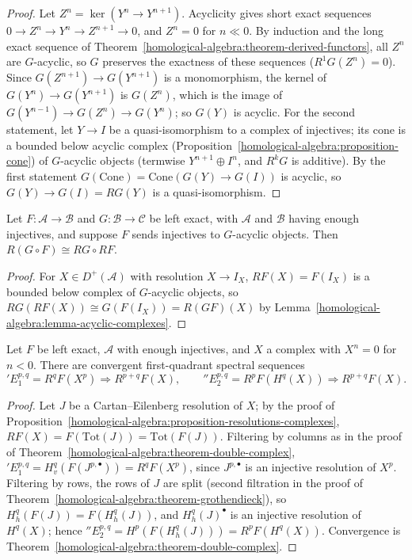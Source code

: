\begin{proof}
Let $Z^n = \ker(Y^n \to Y^{n+1})$. Acyclicity gives short exact sequences $0 \to Z^n \to Y^n \to Z^{n+1} \to 0$, and $Z^n = 0$ for $n \ll 0$. By induction
and the long exact sequence of Theorem~\ref{homological-algebra:theorem-derived-functors}, all $Z^n$ are $G$-acyclic, so $G$ preserves the
exactness of these sequences ($R^1G(Z^n) = 0$). Since $G(Z^{n+1}) \to G(Y^{n+1})$ is a monomorphism, the kernel of $G(Y^n) \to G(Y^{n+1})$ is
$G(Z^n)$, which is the image of $G(Y^{n-1}) \to G(Z^n) \to G(Y^n)$; so $G(Y)$ is acyclic. For the second statement, let $Y \to I$ be a quasi-isomorphism to a complex of
injectives; its cone is a bounded below acyclic complex (Proposition~\ref{homological-algebra:proposition-cone}) of $G$-acyclic objects
(termwise $Y^{n+1} \oplus I^n$, and $R^kG$ is additive). By the first statement $G(\mathrm{Cone}) = \mathrm{Cone}(G(Y) \to G(I))$ is acyclic, so
$G(Y) \to G(I) = RG(Y)$ is a quasi-isomorphism.
\end{proof}

\begin{theorem}\label{homological-algebra:theorem-composition}
Let $F \colon \mathcal{A} \to \mathcal{B}$ and $G \colon \mathcal{B} \to \mathcal{C}$ be left exact, with $\mathcal{A}$ and $\mathcal{B}$ having enough injectives,
and suppose $F$ sends injectives to $G$-acyclic objects. Then $R(G \circ F) \cong RG \circ RF$.
\end{theorem}

\begin{proof}
For $X \in D^+(\mathcal{A})$ with resolution $X \to I_X$, $RF(X) = F(I_X)$ is a bounded below complex of $G$-acyclic objects, so
$RG(RF(X)) \cong G(F(I_X)) = R(GF)(X)$ by Lemma~\ref{homological-algebra:lemma-acyclic-complexes}.
\end{proof}

\begin{proposition}\label{homological-algebra:proposition-hypercohomology}
Let $F$ be left exact, $\mathcal{A}$ with enough injectives, and $X$ a complex with $X^n = 0$ for $n < 0$. There are convergent first-quadrant
spectral sequences
\[
{}'E_1^{p,q} = R^qF(X^p) \Rightarrow R^{p+q}F(X), \qquad {}''E_2^{p,q} = R^pF(H^q(X)) \Rightarrow R^{p+q}F(X).
\]
\end{proposition}

\begin{proof}
Let $J$ be a Cartan--Eilenberg resolution of $X$; by the proof of Proposition~\ref{homological-algebra:proposition-resolutions-complexes},
$RF(X) = F(\mathrm{Tot}(J)) = \mathrm{Tot}(F(J))$. Filtering by columns as in the proof of Theorem~\ref{homological-algebra:theorem-double-complex},
${}'E_1^{p,q} = H^q_v(F(J^{p,\bullet})) = R^qF(X^p)$, since $J^{p,\bullet}$ is an injective resolution of $X^p$. Filtering by rows, the rows of $J$ are split
(second filtration in the proof of Theorem~\ref{homological-algebra:theorem-grothendieck}), so $H^q_h(F(J)) = F(H^q_h(J))$, and $H^q_h(J)^{\bullet}$ is
an injective resolution of $H^q(X)$; hence ${}''E_2^{p,q} = H^p(F(H^q_h(J))) = R^pF(H^q(X))$. Convergence is
Theorem~\ref{homological-algebra:theorem-double-complex}.
\end{proof}

